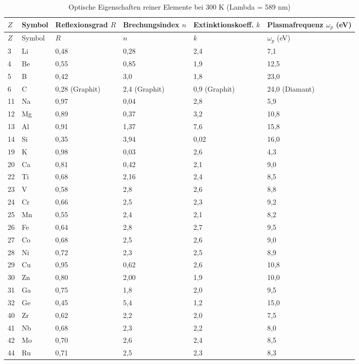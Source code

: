 \documentclass[12pt,a4paper]{article}
\begin{document}
	\begin{longtable}{p{0.8cm}p{1.2cm}p{2.2cm}p{2.2cm}p{2.2cm}p{2.2cm}}
		\caption{Optische Eigenschaften reiner Elemente bei 300 K (Lambda = 589 nm)} \label{tab:optical-properties-func} \\
		\toprule
		\(Z\) & Symbol & Reflexionsgrad \(R\) & Brechungsindex \(n\) & Extinktionskoeff. \(k\) & Plasmafrequenz \(\omega_p\) (eV) \\
		\midrule
		\endfirsthead
		\toprule
		\(Z\) & Symbol & \(R\) & \(n\) & \(k\) & \(\omega_p\) (eV) \\
		\midrule
		\endhead
		3  & Li & 0,48 & 0,28 & 2,4 & 7,1 \\
		4  & Be & 0,55 & 0,85 & 1,9 & 12,5 \\
		5  & B  & 0,42 & 3,0 & 1,8 & 23,0 \\
		6  & C  & 0,28 (Graphit) & 2,4 (Graphit) & 0,9 (Graphit) & 24,0 (Diamant) \\
		11 & Na & 0,97 & 0,04 & 2,8 & 5,9 \\
		12 & Mg & 0,89 & 0,37 & 3,2 & 10,8 \\
		13 & Al & 0,91 & 1,37 & 7,6 & 15,8 \\
		14 & Si & 0,35 & 3,94 & 0,02 & 16,0 \\
		19 & K  & 0,98 & 0,03 & 2,6 & 4,3 \\
		20 & Ca & 0,81 & 0,42 & 2,1 & 9,0 \\
		22 & Ti & 0,68 & 2,16 & 2,4 & 8,5 \\
		23 & V  & 0,58 & 2,8 & 2,6 & 8,8 \\
		24 & Cr & 0,66 & 2,5 & 2,3 & 9,2 \\
		25 & Mn & 0,55 & 2,4 & 2,1 & 8,2 \\
		26 & Fe & 0,64 & 2,8 & 2,7 & 9,5 \\
		27 & Co & 0,68 & 2,5 & 2,6 & 9,0 \\
		28 & Ni & 0,72 & 2,3 & 2,5 & 8,9 \\
		29 & Cu & 0,95 & 0,62 & 2,6 & 10,8 \\
		30 & Zn & 0,80 & 2,00 & 1,9 & 10,0 \\
		31 & Ga & 0,75 & 1,8 & 2,0 & 9,5 \\
		32 & Ge & 0,45 & 5,4 & 1,2 & 15,0 \\
		40 & Zr & 0,62 & 2,2 & 2,0 & 7,5 \\
		41 & Nb & 0,68 & 2,3 & 2,2 & 8,0 \\
		42 & Mo & 0,70 & 2,6 & 2,4 & 8,5 \\
		44 & Ru & 0,71 & 2,5 & 2,3 & 8,3 \\

\end{longtable}
\end{document}
